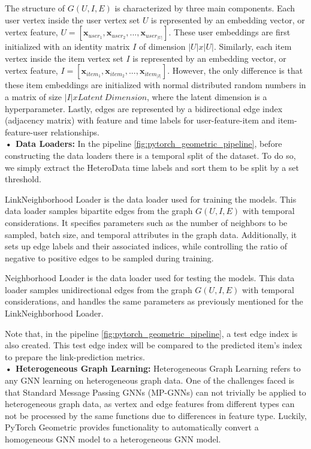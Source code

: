\documentclass{scrartcl}
\begin{document}
The structure of $G(U,I,E)$ is characterized by three main components. Each user vertex inside the user vertex set $U$ is represented by an embedding vector, or vertex feature, $U=[\mathbf{x}_{user_{1}},\mathbf{x}_{user_{2}}, ..., \mathbf{x}_{user_{|U|}}]$. These user embeddings are first initialized with an identity matrix $I$ of dimension $|U|x|U|$. Similarly, each item vertex inside the item vertex set $I$ is represented by an embedding vector, or vertex feature, $I=[\mathbf{x}_{item_{1}},\mathbf{x}_{item_{2}}, ..., \mathbf{x}_{item_{|I|}}]$. However, the only difference is that these item embeddings are initialized with normal distributed random numbers in a matrix of size $|I|xLatent \ Dimension$, where the latent dimension is a hyperparameter. Lastly, edges are represented by a bidirectional edge index (adjacency matrix) with feature and time labels for user-feature-item and item-feature-user relationships. \\

\textbf{• Data Loaders:} In the pipeline \ref{fig:pytorch_geometric_pipeline}, before constructing the data loaders there is a temporal split of the dataset. To do so, we simply extract the HeteroData time labels and sort them to be split by a set threshold.

LinkNeighborhood Loader is the data loader used for training the models. This data loader samples bipartite edges from the graph $G(U,I,E)$ with temporal considerations. It specifies parameters such as the number of neighbors to be sampled, batch size, and temporal attributes in the graph data. Additionally, it sets up edge labels and their associated indices, while controlling the ratio of negative to positive edges to be sampled during training. 

Neighborhood Loader\cite{sageconv} is the data loader used for testing the models. This data loader samples unidirectional edges from the graph $G(U,I,E)$ with temporal considerations, and handles the same parameters as previously mentioned for the LinkNeighborhood Loader.

Note that, in the pipeline \ref{fig:pytorch_geometric_pipeline}, a test edge index is also created. This test edge index will be compared to the predicted item’s index to prepare the link-prediction metrics. \\ 

\textbf{• Heterogeneous Graph Learning:} Heterogeneous Graph Learning refers to any GNN learning on heterogeneous graph data. One of the challenges faced is that Standard Message Passing GNNs (MP-GNNs) can not trivially be applied to heterogeneous graph data, as vertex and edge features from different types can not be processed by the same functions due to differences in feature type. Luckily, PyTorch Geometric provides functionality to automatically convert a homogeneous GNN model to a heterogeneous GNN model. 
\end{document}
